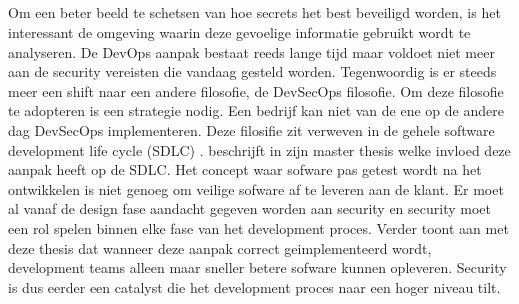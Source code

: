 \subsection{}
\label{sec:DevSecOps impact op de pipeline}
Om een beter beeld te schetsen van hoe secrets het best beveiligd worden, is het interessant de omgeving waarin deze gevoelige informatie gebruikt wordt te analyseren. De DevOps aanpak bestaat reeds lange tijd maar voldoet niet meer aan de security vereisten die vandaag gesteld worden. Tegenwoordig is er steeds meer een shift naar een andere filosofie, de DevSecOps filosofie. Om deze filosofie te adopteren is een strategie nodig. Een bedrijf kan niet van de ene op de andere dag DevSecOps implementeren. Deze filosifie zit verweven in de gehele software development life cycle (SDLC) \autocite{Jenkins}. \textcite{Ahmed2019} beschrijft in zijn master thesis welke invloed deze aanpak heeft op de SDLC. Het concept waar sofware pas getest wordt na het ontwikkelen is niet genoeg om veilige sofware af te leveren aan de klant. Er moet al vanaf de design fase aandacht gegeven worden aan security en security moet een rol spelen binnen elke fase van het development proces. Verder toont \textcite{Ahmed2019} aan met deze thesis dat wanneer deze aanpak correct geimplementeerd wordt, development teams alleen maar sneller betere sofware kunnen opleveren. Security is dus eerder een catalyst die het development proces naar een hoger niveau tilt.

